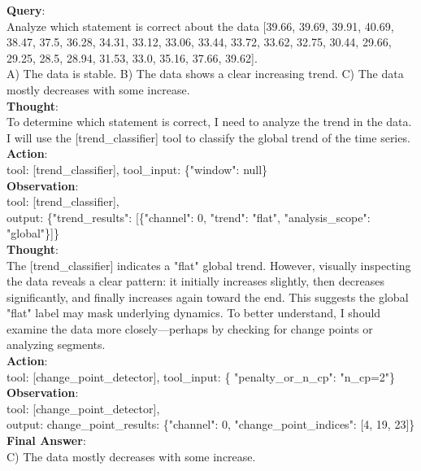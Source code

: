 \clearpage
\begin{tcolorbox}[
  colback=white,
  colframe=black!50,
  boxrule=0.3mm,
  width=\textwidth,
  rounded corners,
  title=Sample 5: Pattern Recognition,
  fonttitle=\bfseries,
  left=2mm, right=2mm, top=2mm, bottom=2mm
]
\textbf{Query}:\\
Analyze which statement is correct about the data [39.66, 39.69, 39.91, 40.69, 38.47, 37.5, 36.28, 34.31, 33.12, 33.06, 33.44, 33.72, 33.62, 32.75, 30.44, 29.66, 29.25, 28.5, 28.94, 31.53, 33.0, 35.16, 37.66, 39.62]. \\
A) The data is stable. B) The data shows a clear increasing trend. C) The data mostly decreases with some increase. \\

\textbf{Thought}:\\
To determine which statement is correct, I need to analyze the trend in the data. I will use the [trend\_classifier] tool to classify the global trend of the time series.\\

\textbf{Action}:\\
tool: [trend\_classifier], tool\_input: \{"window": null\} \\

\textbf{Observation}: \\
tool: [trend\_classifier], 
\\
output: \{"trend\_results": [\{"channel": 0, "trend": "flat", "analysis\_scope": "global"\}]\} \\

\textbf{Thought}: \\
The [trend\_classifier] indicates a "flat" global trend. However, visually inspecting the data reveals a clear pattern: it initially increases slightly, then decreases significantly, and finally increases again toward the end. This suggests the global "flat" label may mask underlying dynamics. To better understand, I should examine the data more closely—perhaps by checking for change points or analyzing segments. \\

\textbf{Action}: \\
tool: [change\_point\_detector], tool\_input: \{    "penalty\_or\_n\_cp": "n\_cp=2"\} \\

\textbf{Observation}:\\
tool: [change\_point\_detector],\\
output: change\_point\_results: \{"channel": 0, "change\_point\_indices": [4, 19, 23]\} \\

\textbf{Final Answer}:\\
C) The data mostly decreases with some increase.
\end{tcolorbox}

